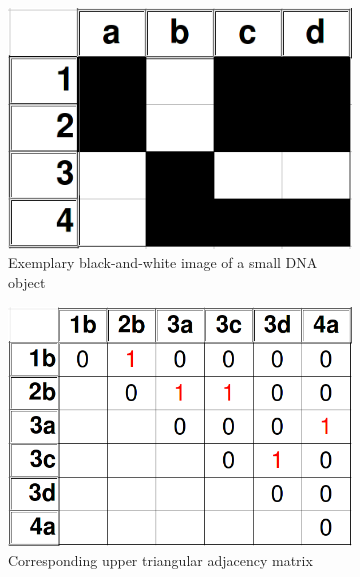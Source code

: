 \documentclass{article}
\begin{document}
\begin{figure}[!htbp]
	\centering
	\begin{subfigure}{0.25\textwidth}
		\includegraphics[width=\linewidth]{small_DNA_obj.png}
		\caption{Exemplary black-and-white image of a small DNA object}
		\label{fig:dna_obj_example}
	\end{subfigure}
	\begin{subfigure}{0.25\textwidth}
		\includegraphics[width=\linewidth]{small_DNA_obj_adj_matrix.png}
		\caption{Corresponding upper triangular adjacency matrix}
		\label{fig:dna_obj_adjMatrix}
	\end{subfigure}
	\begin{subfigure}{0.25\textwidth}

\end{subfigure}
\end{figure}
\end{document}

